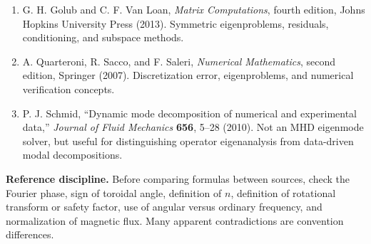 \begin{enumerate}[leftmargin=1.8em]
\item G. H. Golub and C. F. Van Loan, \emph{Matrix Computations}, fourth edition, Johns Hopkins University Press (2013). Symmetric eigenproblems, residuals, conditioning, and subspace methods.

\item A. Quarteroni, R. Sacco, and F. Saleri, \emph{Numerical Mathematics}, second edition, Springer (2007). Discretization error, eigenproblems, and numerical verification concepts.

\item P. J. Schmid, ``Dynamic mode decomposition of numerical and experimental data,'' \emph{Journal of Fluid Mechanics} \textbf{656}, 5--28 (2010). Not an MHD eigenmode solver, but useful for distinguishing operator eigenanalysis from data-driven modal decompositions.
\end{enumerate}

\begin{notebox}
\textbf{Reference discipline.} Before comparing formulas between sources, check the Fourier phase, sign of toroidal angle, definition of $n$, definition of rotational transform or safety factor, use of angular versus ordinary frequency, and normalization of magnetic flux. Many apparent contradictions are convention differences.
\end{notebox}
